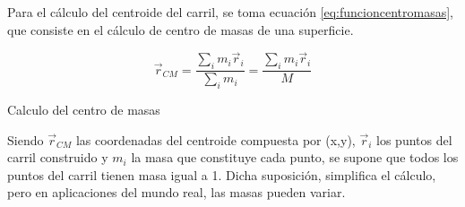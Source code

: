Para el cálculo del centroide del carril, se toma ecuación \ref{eq:funcioncentromasas}, que consiste en el cálculo de centro de masas de una superficie. 
  \begin{myequation}[h]
    \begin{equation} 
      \vec{r}_{CM} = \frac{\sum_{i}m_{i} \vec{r}_{i}}{\sum_{i}m_{i}} = \frac{\sum_{i}m_{i} \vec{r}_{i}}{M} 
      \label{eq:funcioncentromasas}
    \end{equation} 
    \caption{Calculo del centro de masas}
    \vspace{-1.5em}
  \end{myequation}

  Siendo $\vec{r}_{CM}$ las coordenadas del centroide compuesta por (x,y), $\vec{r}_{i}$ los puntos del carril construido y $m_{i}$ la masa que constituye cada punto, se supone que todos 
  los puntos del carril tienen masa igual a 1. Dicha suposición, simplifica el cálculo, pero en aplicaciones del mundo real, las masas pueden variar. 

